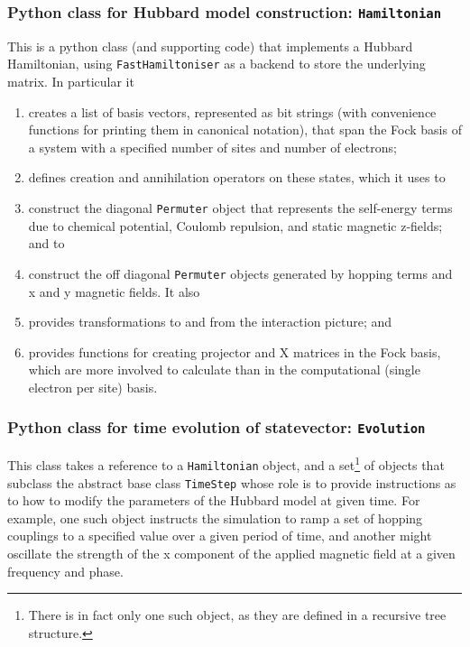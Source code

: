 \documentclass{report}
\begin{document}
\begin{appendices}
\subsubsection{Python class for Hubbard model construction: \texttt{Hamiltonian}}
This is a python class (and supporting code) that implements a Hubbard Hamiltonian, using \texttt{FastHamiltoniser} as a backend to store the underlying matrix. In particular it
\begin{enumerate}
    \item creates a list of basis vectors, represented as bit strings (with convenience functions for printing them in canonical notation), that span the Fock basis of a system with a specified number of sites and number of electrons;
    \item defines creation and annihilation operators on these states, which it uses to
    \item construct the diagonal \texttt{Permuter} object that represents the self-energy terms due to chemical potential, Coulomb repulsion, and static magnetic z-fields; and to
    \item construct the off diagonal \texttt{Permuter} objects generated by hopping terms and x and y magnetic fields. It also
    \item provides transformations to and from the interaction picture; and
    \item provides functions for creating projector and X matrices in the Fock basis, which are more involved to calculate than in the computational (single electron per site) basis. 
\end{enumerate}

\subsubsection{Python class for time evolution of statevector: \texttt{Evolution}}

This class takes a reference to a \texttt{Hamiltonian} object, and a set\footnote{There is in fact only one such object, as they are defined in a recursive tree structure.} of objects that subclass the abstract base class \texttt{TimeStep} whose role is to provide instructions as to how to modify the parameters of the Hubbard model at given time. For example, one such object instructs the simulation to ramp a set of hopping couplings to a specified value over a given period of time, and another might oscillate the strength of the x component of the applied magnetic field at a given frequency and phase.


\end{appendices}
\end{document}
